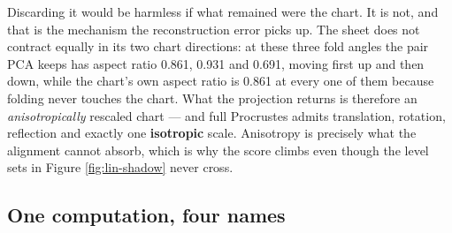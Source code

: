 \documentclass[
  british,
  a4paper,
]{book}
\begin{document}
Discarding it would be harmless if what remained were the chart. It is not, and
that is the mechanism the reconstruction error picks up. The sheet does not
contract equally in its two chart directions: at these three fold angles the pair
PCA keeps has aspect ratio 0.861, 0.931 and
0.691, moving first up and then down, while the chart's own
aspect ratio is 0.861 at every one of them because folding
never touches the chart. What the projection returns is therefore an
\emph{anisotropically} rescaled chart --- and full Procrustes admits translation,
rotation, reflection and exactly one \textbf{isotropic} scale. Anisotropy is precisely
what the alignment cannot absorb, which is why the score climbs even though the
level sets in Figure \ref{fig:lin-shadow} never cross.

\subsection{One computation, four names}\label{one-computation-four-names}
\end{document}
